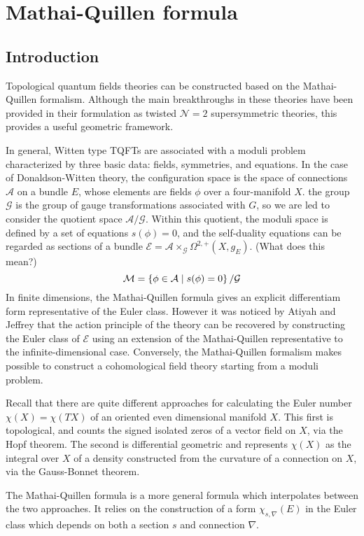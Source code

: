 
\chapter{Mathai-Quillen formula}
\label{chapter3}
\section{Introduction}
Topological quantum fields theories can be constructed based on the
Mathai-Quillen formalism. Although the main breakthroughs in these theories have
been provided in their formulation as twisted $\mathcal{N}=2$ supersymmetric
theories, this provides a useful geometric framework.\cite{TQFTbook}

In general, Witten type TQFTs are associated with a moduli problem characterized
by three basic data: fields, symmetries, and equations.
In the case of Donaldson-Witten theory, the configuration space is the space of
connections $\mathcal{A}$ on a bundle $E$, whose elements are fields 
$\phi$ over a four-manifold  $X$.  the group $\mathcal{G}$ is the group of gauge
transformations associated with $G$, so we are led to consider the quotient
space  $\mathcal{A}/\mathcal{G}$. Within this quotient, the moduli space is
defined by a set of equations $s(\phi)=0$, and the self-duality equations can be
regarded as sections of a bundle
$\mathcal{E}=\mathcal{A}\times_{\mathcal{G}}\Omega^{2,+}(X,g_E)$. (What does
this mean?)
 \[
 \mathcal{M} = \set{\phi\in \mathcal{A} \mid s(\phi)=0}/\mathcal{G}
\] 
In finite dimensions, the Mathai-Quillen formula gives an explicit differentiam
form representative of the Euler class. However it was noticed by Atiyah and
Jeffrey \cite{atiyahlagrangians} that the action principle of the theory can be
recovered by constructing the Euler class of $\mathcal{E}$ using an extension of
the Mathai-Quillen representative to the infinite-dimensional case. Conversely,
the Mathai-Quillen formalism makes possible to construct a cohomological field
theory starting from a moduli problem.

Recall that there are quite different approaches for calculating the Euler number
$\chi(X) = \chi(TX)$ of an oriented even dimensional manifold $X$. 
This first is topological, and counts
the signed isolated zeros of a vector field on $X$, via the Hopf theorem. The
second is differential geometric and represents  $\chi(X)$ as the integral over
$X$ of a density constructed from the curvature of a connection on $X$, via
the Gauss-Bonnet theorem. 

The Mathai-Quillen formula \cite{MQformula} is a more general formula which interpolates between
the two approaches. It relies on the construction of a form $\chi_{s,\nabla}(E)$ in
the Euler class which depends
on both a section  $s$ and connection  $\nabla$.  

